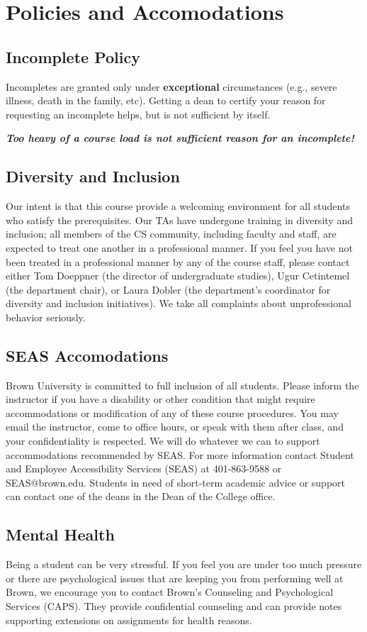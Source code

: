 \documentclass{article}
\begin{document}
\section{Policies and Accomodations}
\subsection{Incomplete Policy}
Incompletes are granted only under \textbf{exceptional} circumstances (e.g., severe illness, death in the family, etc). Getting a dean to certify your reason for requesting an incomplete helps, but is not sufficient by itself.

\textbf{\emph{Too heavy of a course load is not sufficient reason for an incomplete!}}

\subsection{Diversity and Inclusion}
Our intent is that this course provide a welcoming environment for all students who satisfy the prerequisites. Our TAs have undergone training in diversity and inclusion; all members of the CS community, including faculty and staff, are expected to treat one another in a professional manner. If you feel you have not been treated in a professional manner by any of the course staff, please contact either Tom Doeppner (the director of undergraduate studies), Ugur Cetintemel (the department chair), or Laura Dobler (the department’s coordinator for diversity and inclusion initiatives). We take all complaints about unprofessional behavior seriously.

\subsection{SEAS Accomodations}
Brown University is committed to full inclusion of all students. Please inform the instructor if you have a disability or other condition that might require accommodations or modification of any of these course procedures. You may email the instructor, come to office hours, or speak with them after class, and your confidentiality is respected. We will do whatever we can to support accommodations recommended by SEAS. For more information contact Student and Employee Accessibility Services (SEAS) at 401-863-9588 or SEAS@brown.edu. Students in need of short-term academic advice or support can contact one of the deans in the Dean of the College office.

\subsection{Mental Health}
Being a student can be very stressful. If you feel you are under too much pressure or there are psychological issues that are keeping you from performing well at Brown, we encourage you to contact Brown’s Counseling and Psychological Services (CAPS). They provide confidential counseling and can provide notes supporting extensions on assignments for health reasons.
\end{document}
